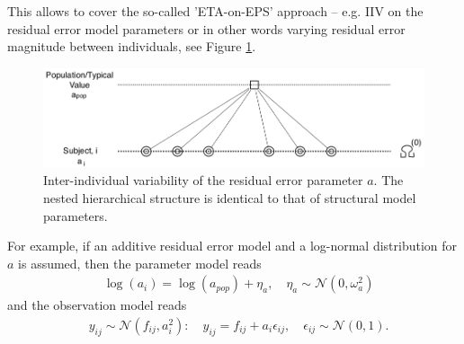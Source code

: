 This allows \pharmml to cover the so-called 'ETA-on-EPS' approach -- e.g. IIV on the residual error model parameters or in other words varying residual
error magnitude between individuals, see Figure \ref{fig:IOV0_residualError}.
\begin{figure}[htb!]
\centering
  \includegraphics[width=125mm]{pics/IOV0_residualError}
 \caption{Inter-individual variability of the residual error parameter $a$. The nested hierarchical structure is identical to that of structural model parameters.}
 \label{fig:IOV0_residualError}
\end{figure}
For example, if an additive residual error model and a log-normal distribution for $a$ is assumed, then the parameter model reads
\begin{align*}
	& \log(a_i) = \log(a_{pop}) + \eta_a, \quad  \eta_a \sim \mathcal{N}(0,\omega_a^2)
\end{align*}
and the observation model reads
\begin{align*}
	& y_{ij} \sim \mathcal{N}(f_{ij},a_i^2): \quad y_{ij} = f_{ij} + a_i \epsilon_{ij}, \quad \epsilon_{ij} \sim \mathcal{N}(0,1).
\end{align*}


